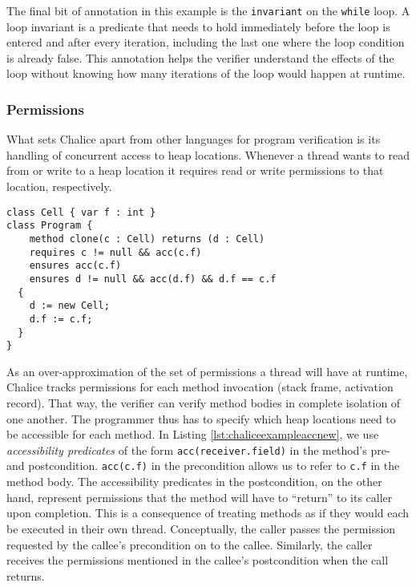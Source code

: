 The final bit of annotation in this example is the \lstinline[language=Chalice]!invariant! on the \lstinline[language=Chalice]!while! loop. 
A loop invariant is a predicate that needs to hold immediately before the loop is entered and after every iteration, including the last one where the loop condition is already false.
This annotation helps the verifier understand the effects of the loop without knowing how many iterations of the loop would happen at runtime.

\subsubsection{Permissions}

What sets Chalice apart from other languages for program verification is its handling of concurrent access to heap locations. 
Whenever a thread wants to read from or write to a heap location it requires read or write permissions to that location, respectively.

\begin{lstlisting}[language=Chalice,float,caption={Chalice example of object creation and (write) accessibility predicates.},label={lst:chaliceexampleaccnew}]
class Cell { var f : int }
class Program {
 	method clone(c : Cell) returns (d : Cell)
    requires c != null && acc(c.f)
    ensures acc(c.f)
    ensures d != null && acc(d.f) && d.f == c.f
  {
    d := new Cell;
    d.f := c.f;
  }
}
\end{lstlisting}

As an over-approximation of the set of permissions a thread will have at runtime, Chalice tracks permissions for each method invocation (stack frame, activation record). 
That way, the verifier can verify method bodies in complete isolation of one another. 
The programmer thus has to specify which heap locations need to be accessible for each method.
In Listing \ref{lst:chaliceexampleaccnew}, we use \emph{accessibility predicates} of the form \lstinline!acc(receiver.field)! in the method's pre- and postcondition. 
\lstinline!acc(c.f)! in the precondition allows us to refer to \lstinline!c.f! in the method body. 
The accessibility predicates in the postcondition, on the other hand, represent permissions that the method will have to ``return'' to its caller upon completion.
This is a consequence of treating methods as if they would each be executed in their own thread.
Conceptually, the caller passes the permission requested by the callee's precondition on to the callee.
Similarly, the caller receives the permissions mentioned in the callee's postcondition when the call returns.

